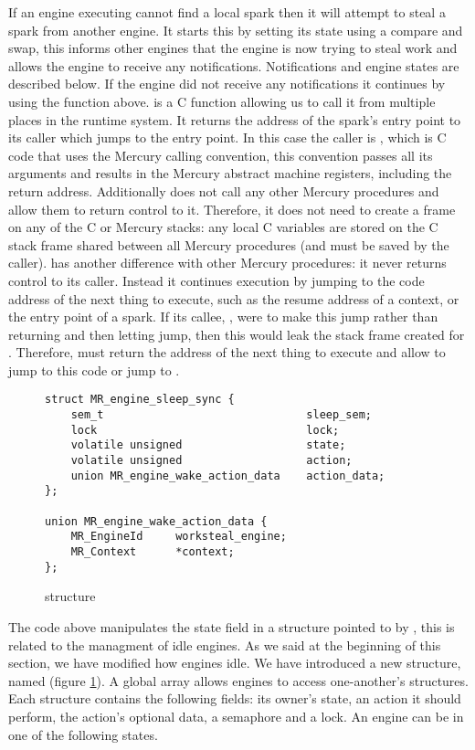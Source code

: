 If an engine executing \idle cannot find a local spark then it will attempt
to steal a spark from another engine.
It starts this by setting its state using a compare and swap,
this informs other engines that the engine is now trying to steal work and
allows the engine to receive any notifications.
Notifications and engine states are described below.
If the engine did not receive any notifications it continues by using the
\trystealspark function above.
\trystealspark is a C function allowing us to call it from multiple places
in the runtime system.
It returns the address of the spark's entry point to its caller which jumps
to the entry point.
In this case the caller is \idle,
which is C code that uses the Mercury calling convention,
this convention passes all its arguments and results in the Mercury abstract
machine registers, including the return address.
Additionally \idle does not call any other Mercury procedures and allow them
to return control to it.
Therefore, it does not need to create a frame on any of the C or Mercury stacks:
any local C variables are stored on the C stack frame shared between all
Mercury procedures (and must be saved by the caller).
\idle has another difference with other Mercury procedures:
it never returns control to its caller.
Instead it continues execution by jumping to the code address of the next
thing to execute,
such as the resume address of a context,
or the entry point of a spark.
If its callee, \trystealspark, were to make this jump rather than
returning and then letting \idle jump,
then this would leak the stack frame created for \trystealspark.
Therefore, \trystealspark must return the address of the next thing to
execute and allow \idle to jump to this code or jump to \sleep.

\begin{figure}
\begin{verbatim}
struct MR_engine_sleep_sync {
    sem_t                               sleep_sem;
    lock                                lock;
    volatile unsigned                   state;
    volatile unsigned                   action;
    union MR_engine_wake_action_data    action_data;
};

union MR_engine_wake_action_data {
    MR_EngineId     worksteal_engine;
    MR_Context      *context;
};
\end{verbatim}
\caption{\enginesleepsync structure}
\label{fig:engine_sleep_sync}
\end{figure}

The \idle code above manipulates the state field in a structure pointed to
by ,
this is related to the managment of idle engines.
As we said at the beginning of this section,
we have modified how engines idle.
We have introduced a new structure, named \enginesleepsync
(figure \ref{fig:engine_sleep_sync}).
A global array allows engines to access one-another's \enginesleepsync
structures.
Each structure contains the following fields:
its owner's state,
an action it should perform,
the action's optional data,
a semaphore and a lock.
An engine can be in one of the following states.

